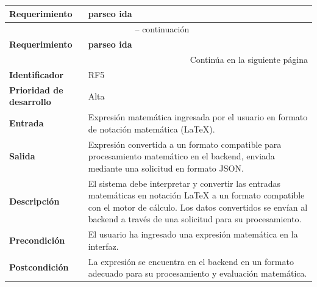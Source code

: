 \begin{longtable}{|m{3.5cm}|m{9.5cm}|}
	\hline
	\rowcolor{black!75} \color{white}\textbf{Requerimiento} & \color{white}\textbf{parseo ida} \\
	\hline
	\endfirsthead
	\multicolumn{2}{c}{{\tablename\ \thetable{} -- continuación}} \\
	\hline
	\rowcolor{black!75} \color{white}\textbf{Requerimiento} & \color{white}\textbf{parseo ida} \\
	\hline
	\endhead
	\hline \multicolumn{2}{r}{{Continúa en la siguiente página}} \\
	\endfoot
	\hline
	\endlastfoot
	
	\textbf{Identificador} & RF5 \\
	\hline
	\textbf{Prioridad de desarrollo} & Alta \\
	\hline
	\textbf{Entrada} & Expresión matemática ingresada por el usuario en formato de notación matemática (LaTeX). \\
	\hline
	\textbf{Salida} & Expresión convertida a un formato compatible para procesamiento matemático en el backend, enviada mediante una solicitud en formato JSON. \\
	\hline
	\textbf{Descripción} & El sistema debe interpretar y convertir las entradas matemáticas en notación LaTeX a un formato compatible con el motor de cálculo. Los datos convertidos se envían al backend a través de una solicitud para su procesamiento. \\
	\hline
	\textbf{Precondición} & El usuario ha ingresado una expresión matemática en la interfaz. \\
	\hline
	\textbf{Postcondición} & La expresión se encuentra en el backend en un formato adecuado para su procesamiento y evaluación matemática. \\
	\hline
\end{longtable}
\caption{Requerimiento funcional No. 5} \label{tabla:RF5}
\vspace{0.5cm}

